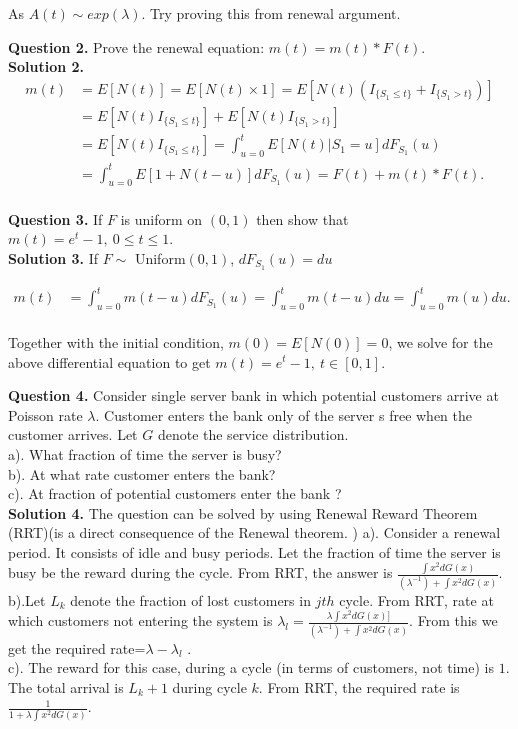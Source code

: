\documentclass[12,a4paper,onecolumn]{article}
\begin{document}
 As $A(t) \sim exp(\lambda)$. Try proving this from renewal argument.

\textbf{Question 2.} Prove the renewal equation: $m(t)=m(t)*F(t)$.\\

\textbf{Solution 2.}
\begin{align*}
m(t)&=E[N(t)]=E[N(t)\times 1]=E[N(t)(I_{\{S_1\leq t\}}+I_{\{S_1>t\}})]\\
&=E[N(t)I_{\{S_1\leq t\}}]+E[N(t)I_{\{S_1>t\}}]\\
&=E[N(t)I_{\{S_1\leq t\}}]=\int_{u=0}^{t}E[N(t)|{S_1= u}]dF_{S_1}(u)\\
&=\int_{u=0}^{t}E[1+N(t-u)]dF_{S_1}(u)=F(t)+ m(t)*F(t).\\
\end{align*}

\textbf{Question 3.} If $F$ is uniform on $(0,1)$ then show that $m(t)=e^t-1,~0\leq t \leq 1$.\\

\textbf{Solution 3.} If $F\sim$ Uniform$(0,1)$, $dF_{S_1}(u)=du$

\begin{align*}
m(t)&=\int_{u=0}^{t}m(t-u)dF_{S_1}(u)=\int_{u=0}^{t}m(t-u)du=\int_{u=0}^{t}m(u)du.\\
\end{align*}

Together with the initial condition, $m(0)=E[N(0)]=0$, we solve for the above differential equation to get $m(t)=e^t-1,~t\in[0,1].$

\textbf{Question 4.} Consider single server bank in which potential customers arrive at Poisson rate $\lambda$. Customer enters the bank only of the server s free when the customer arrives. Let $G$ denote the service distribution.\\
a). What fraction of time the server is busy?\\
b). At what rate customer enters the bank?\\
c). At fraction of potential customers enter the bank ?\\

\textbf{Solution 4.} The question can be solved by using Renewal Reward Theorem (RRT)(is a direct consequence of the Renewal theorem. ) a). Consider a renewal period. It consists of idle and busy periods. Let the fraction of time the server is busy be the reward during the cycle. From RRT, the answer is $\frac{\int x^2dG(x)}{(\lambda^{-1})+\int x^2dG(x)}$.\\
b).Let $L_k$ denote the fraction of lost customers in $jth$ cycle. From RRT, rate at which customers not entering the system is $\lambda_l=\frac{\lambda \int x^2dG(x)]}{(\lambda^{-1})+\int x^2dG(x)}$. From this  we get the required rate=$\lambda-\lambda_l$ .\\
c). The reward for this case, during a cycle (in terms of customers, not time) is $1$. The total arrival is $L_k+1$ during cycle $k$. From RRT, the required rate is $\frac{1}{1+\lambda \int x^2 dG(x)}$.\\
\end{document}
